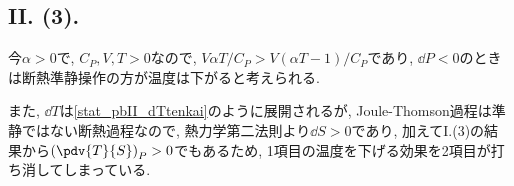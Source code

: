 \subsection*{II. (3). }
今$\alpha>0$で, $C_P, V, T>0$なので, ${V\alpha T}/{C_P}>V(\alpha T-1)/C_P$であり, $\dd{P}<0$のときは断熱準静操作の方が温度は下がると考えられる. 

また, $\dd{T}$は\eqref{stat_pbII_dTtenkai}のように展開されるが, Joule-Thomson過程は準静ではない断熱過程なので, 熱力学第二法則より$\dd{S}>0$であり, 加えてI.(3)の結果から$\left( \pdv{T}{S} \right)_P>0$でもあるため, 1項目の温度を下げる効果を2項目が打ち消してしまっている. 








